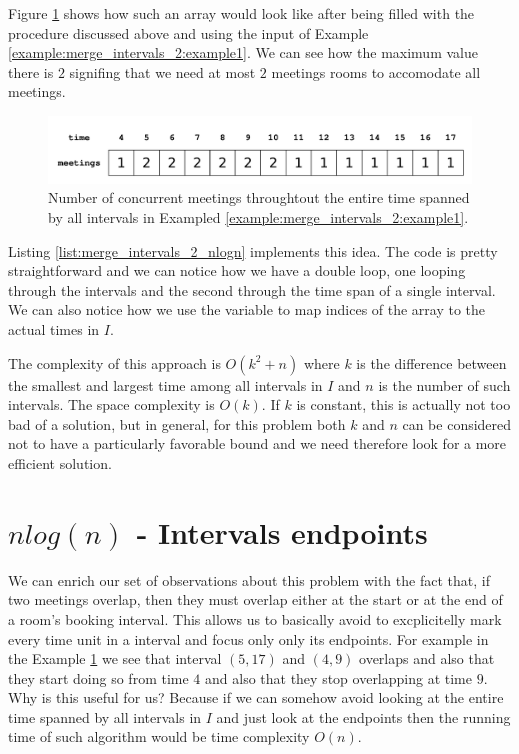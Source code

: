 Figure \ref{fig:merge_intervals_2:example1} shows how such an array would look like after being filled with the procedure discussed above and using the input of Example \ref{example:merge_intervals_2:example1}. 
We can see how the maximum value there is $2$ signifing that we need at most $2$ meetings rooms to accomodate all meetings.
\begin{figure}
	\centering
	\includegraphics[width=\textwidth]{sources/merge_intervals_2/images/example2_meetings}
	\caption[]{Number of concurrent meetings throughtout the entire time spanned by all intervals in Exampled \ref{example:merge_intervals_2:example1}.}
	\label{fig:merge_intervals_2:example1}
\end{figure}

Listing \ref{list:merge_intervals_2_nlogn} implements this idea. 
The code is pretty straightforward and we can notice how we have a double loop, one looping through the intervals and the second through the time span of a single interval.
We can also notice how we use the variable  to map indices of the array  to the actual times in $I$.



The complexity of this approach is $O(k^2 + n)$ where $k$ is the difference between the smallest and largest time among all intervals in $I$ and $n$ is the number of such intervals.
The space complexity is $O(k)$. If $k$ is constant, this is actually not too bad of a solution, but in general, for this problem both $k$ and $n$ can be considered not to have a particularly favorable bound and we need therefore look for a more efficient solution.


\section{$nlog(n)$ - Intervals endpoints}
\label{example:merge_intervals_2:sorting_2}
We can enrich our set of observations about this problem with the fact that, if two meetings overlap, then they must overlap either at the start or at the end of a room's booking interval. This allows us to basically avoid to excplicitelly mark every time unit in a interval and focus only only its endpoints. 
For example in the Example \ref{fig:merge_intervals_2:example1}  we see that interval $(5,17)$ and $(4,9)$ overlaps and also that they start doing so from time $4$ and also that they stop overlapping at time $9$.
Why is this useful for us? Because if we can somehow avoid looking at the entire time spanned by all intervals in $I$ and just look at the endpoints then the running time of such algorithm would be time complexity $O(n)$. 

